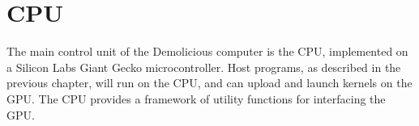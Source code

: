 \documentclass[../main/report.tex]{subfiles}
\begin{document}
\chapter{CPU}

The main control unit of the Demolicious computer is the CPU, implemented on a Silicon Labs Giant Gecko microcontroller. Host programs, as described in the previous chapter, will run on the CPU,
and can upload and launch kernels on the GPU.
The CPU provides a framework of utility functions for interfacing the GPU.










\end{document}
